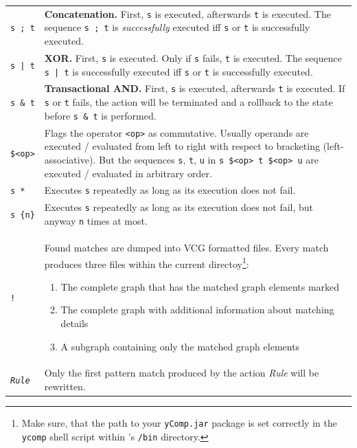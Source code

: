 \begin{table}[htbp]
\begin{minipage}{\linewidth} \renewcommand{\footnoterule}{} 
\begin{tabularx}{\linewidth}{|lX|}
\hline
\texttt{s ; t}		& \textbf{Concatenation.} First, \texttt{s} is executed, afterwards \texttt{t} is executed. The sequence \texttt{s ; t} is \emph{successfully} executed iff \texttt{s} or \texttt{t} is successfully executed.\\
\texttt{s | t}		& \textbf{XOR.} First, \texttt{s} is executed. Only if \texttt{s} fails, \texttt{t} is executed. The sequence \texttt{s | t} is successfully executed iff \texttt{s} or \texttt{t} is successfully executed.\\
\texttt{s \& t}	& \textbf{Transactional AND.} First, \texttt{s} is executed, afterwards \texttt{t} is executed. If \texttt{s} or \texttt{t} fails, the action will be terminated and a rollback to the state before \texttt{s \& t} is performed.\\
\texttt{\$<op>}	& Flags the operator \texttt{<op>} as commutative. Usually operands are executed / evaluated from left to right with respect to bracketing (left-associative). But the sequences \texttt{s}, \texttt{t}, \texttt{u} in \texttt{s \$<op> t \$<op> u} are executed / evaluated in arbitrary order. \\
\texttt{s *}		& Executes \texttt{s} repeatedly as long as its execution does not fail.\\
\texttt{s \{n\}}	& Executes \texttt{s} repeatedly as long as its execution does not fail, but anyway \texttt{n} times at most.\\
\texttt{!}		& Found matches are dumped into VCG formatted files. Every match produces three files within the current directoy\footnote{Make sure, that the path to your \texttt{yComp.jar} package is set correctly in the \texttt{ycomp} shell script within \GrG's \texttt{/bin} directory.}:
\begin{enumerate}
  \item The complete graph that has the matched graph elements marked
  \item The complete graph with additional information about matching details
  \item A subgraph containing only the matched graph elements
\end{enumerate}\\
\texttt{\emph{Rule}} & Only the first pattern match produced by the action \emph{Rule} will be rewritten.\\

\end{tabularx}
\end{minipage}
\end{table}
